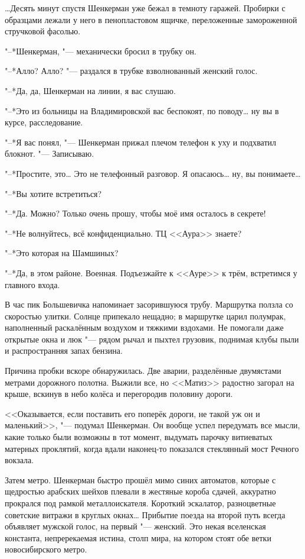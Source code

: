 \ldots{}Десять минут спустя Шенкерман уже бежал в темноту гаражей.
Пробирки с образцами лежали у него в пенопластовом ящичке, переложенные замороженной стручковой фасолью.

\asterism

\textspace

\label{Wed_2012_08_29}

"--*Шенкерман, "--- механически бросил в трубку он.

"--*Алло? Алло? "--- раздался в трубке взволнованный женский голос.

"--*Да, да, Шенкерман на линии, я вас слушаю.

"--*Это из больницы на Владимировской вас беспокоят, по поводу\ldots{} ну вы в курсе, расследование.

"--*Я вас понял, "--- Шенкерман прижал плечом телефон к уху и подхватил блокнот.
"--- Записываю.

"--*Простите, это\ldots{}
Это не телефонный разговор.
Я опасаюсь\ldots{} ну, вы понимаете\ldots{}

"--*Вы хотите встретиться?

"--*Да.
Можно?
Только очень прошу, чтобы моё имя осталось в секрете!

"--*Не волнуйтесь, всё конфиденциально.
ТЦ <<Аура>> знаете?

"--*Это которая на Шамшиных?

"--*Да, в этом районе.
Военная.
Подъезжайте к <<Ауре>> к трём, встретимся у главного входа.

\asterism

В час пик Большевичка напоминает засорившуюся трубу.
Маршрутка ползла со скоростью улитки.
Солнце припекало нещадно;
в маршрутке царил полумрак, наполненный раскалённым воздухом и тяжкими вздохами.
Не помогали даже открытые окна и люк "--- рядом рычал и пыхтел грузовик, поднимая клубы пыли и распространняя запах бензина.

Причина пробки вскоре обнаружилась.
Две аварии, разделённые двумястами метрами дорожного полотна.
Выжили все, но <<Матиз>> радостно загорал на крыше, вскинув в небо колёса и перегородив половину дороги.

<<Оказывается, если поставить его поперёк дороги, не такой уж он и маленький>>, "--- подумал Шенкерман.
Он вообще успел передумать все мысли, какие только были возможны в тот момент, выдумать парочку витиеватых матерных проклятий, когда вдали наконец-то показался стеклянный мост Речного вокзала.

Затем метро.
Шенкерман быстро прошёл мимо синих автоматов, которые с щедростью арабских шейхов плевали в жестяные короба сдачей, аккуратно прокрался под рамкой металлоискателя.
Короткий эскалатор, разноцветные советские витражи в круглых окнах\ldots{}
Прибытие поезда на второй путь всегда объявляет мужской голос, на первый "--- женский.
Это некая вселенская константа, непререкаемая истина, столп мира, на котором стоят обе ветки новосибирского метро.

